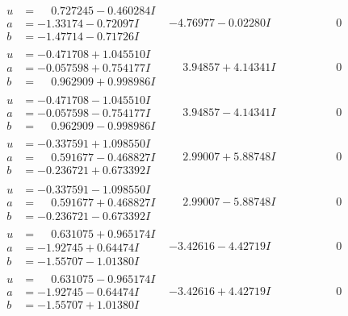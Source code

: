 \documentclass[1p]{elsarticle_modified}
\theoremstyle{definition}
\begin{document}
$$\begin{array}{c|c|c}
\begin{aligned}
u &= \phantom{-}0.727245 - 0.460284 I \\
a &= -1.33174 - 0.72097 I \\
b &= -1.47714 - 0.71726 I\end{aligned}
 & -4.76977 - 0.02280 I & \phantom{-0.000000 } 0 \\ \hline\begin{aligned}
u &= -0.471708 + 1.045510 I \\
a &= -0.057598 + 0.754177 I \\
b &= \phantom{-}0.962909 + 0.998986 I\end{aligned}
 & \phantom{-}3.94857 + 4.14341 I & \phantom{-0.000000 } 0 \\ \hline\begin{aligned}
u &= -0.471708 - 1.045510 I \\
a &= -0.057598 - 0.754177 I \\
b &= \phantom{-}0.962909 - 0.998986 I\end{aligned}
 & \phantom{-}3.94857 - 4.14341 I & \phantom{-0.000000 } 0 \\ \hline\begin{aligned}
u &= -0.337591 + 1.098550 I \\
a &= \phantom{-}0.591677 - 0.468827 I \\
b &= -0.236721 + 0.673392 I\end{aligned}
 & \phantom{-}2.99007 + 5.88748 I & \phantom{-0.000000 } 0 \\ \hline\begin{aligned}
u &= -0.337591 - 1.098550 I \\
a &= \phantom{-}0.591677 + 0.468827 I \\
b &= -0.236721 - 0.673392 I\end{aligned}
 & \phantom{-}2.99007 - 5.88748 I & \phantom{-0.000000 } 0 \\ \hline\begin{aligned}
u &= \phantom{-}0.631075 + 0.965174 I \\
a &= -1.92745 + 0.64474 I \\
b &= -1.55707 - 1.01380 I\end{aligned}
 & -3.42616 - 4.42719 I & \phantom{-0.000000 } 0 \\ \hline\begin{aligned}
u &= \phantom{-}0.631075 - 0.965174 I \\
a &= -1.92745 - 0.64474 I \\
b &= -1.55707 + 1.01380 I\end{aligned}
 & -3.42616 + 4.42719 I & \phantom{-0.000000 } 0 \\ \hline\begin{aligned}

\end{aligned}
\end{array}$$
\end{document}
